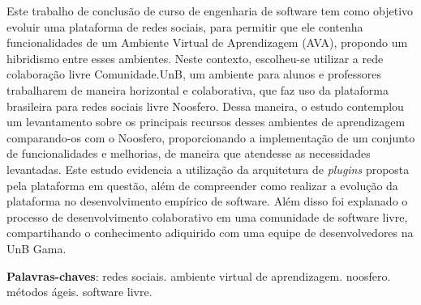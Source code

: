 \begin{resumo}

Este trabalho de conclusão de curso de engenharia de software tem como objetivo evoluir uma plataforma de redes sociais, para permitir que ele contenha funcionalidades de um Ambiente Virtual de Aprendizagem (AVA), propondo um hibridismo entre esses ambientes. Neste contexto, escolheu-se utilizar a rede colaboração livre Comunidade.UnB, um ambiente para alunos e professores trabalharem de maneira horizontal e colaborativa, que faz uso da plataforma brasileira para redes sociais livre Noosfero. Dessa maneira, o estudo contemplou um levantamento sobre os principais recursos desses ambientes de aprendizagem comparando-os com o Noosfero, proporcionando a implementação de um conjunto de funcionalidades e melhorias, de maneira que atendesse as necessidades levantadas. Este estudo evidencia a utilização da arquitetura de \textit{plugins} proposta pela plataforma em questão, além de compreender como realizar a evolução da plataforma no desenvolvimento empírico de software. Além disso foi explanado o processo de desenvolvimento colaborativo em uma comunidade de software livre, compartihando o conhecimento adiquirido com uma equipe de desenvolvedores na UnB Gama.

 \vspace{\onelineskip}
    
 \noindent
 \textbf{Palavras-chaves}: redes sociais. ambiente virtual de aprendizagem. noosfero. métodos ágeis. software livre.
\end{resumo}